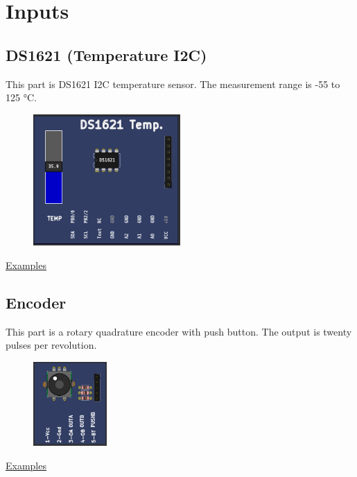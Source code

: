 \section{Inputs}


\subsection{DS1621 (Temperature I2C)}


This part is DS1621 I2C temperature sensor. The measurement range is -55 to 125 °C.

\begin{figure}[H]
\center
\includegraphics[width=0.5\textwidth]{img/part_ds1621.png} 
\end{figure} 


\href{https://lcgamboa.github.io/picsimlab_examples/Parts.html\#DS1621_(Temperature_I2C)}{Examples}


\subsection{Encoder}

This part is a rotary quadrature encoder with push button. The output is twenty pulses per revolution.

\begin{figure}[H]
\center
\includegraphics[width=0.25\textwidth]{img/part_encoder.png} 
\end{figure} 

\href{https://lcgamboa.github.io/picsimlab_examples/Parts.html\#Encoder}{Examples}
 
